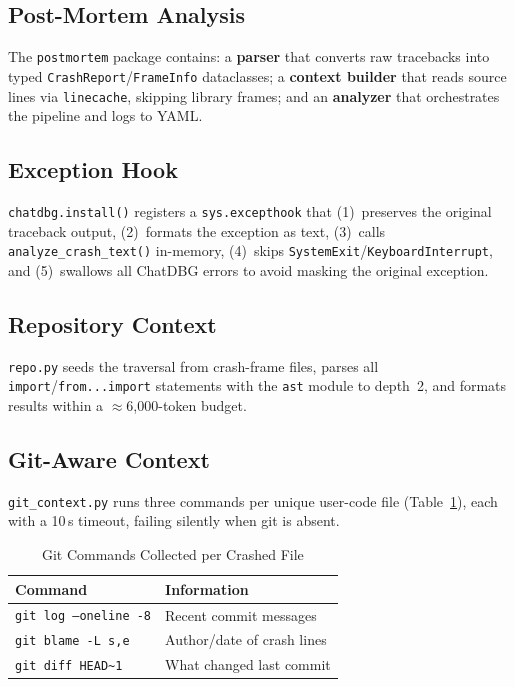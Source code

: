 \documentclass[conference]{IEEEtran}
\begin{document}
\subsection{Post-Mortem Analysis}
The \texttt{postmortem} package contains: a \textbf{parser} that converts raw
tracebacks into typed \texttt{CrashReport}/\texttt{FrameInfo} dataclasses; a
\textbf{context builder} that reads source lines via \texttt{linecache},
skipping library frames; and an \textbf{analyzer} that orchestrates the pipeline
and logs to YAML.

\subsection{Exception Hook}
\texttt{chatdbg.install()} registers a \texttt{sys.excepthook} that
(1)~preserves the original traceback output, (2)~formats the exception as text,
(3)~calls \texttt{analyze\_crash\_text()} in-memory,
(4)~skips \texttt{SystemExit}/\texttt{KeyboardInterrupt}, and
(5)~swallows all ChatDBG errors to avoid masking the original exception.

\subsection{Repository Context}
\texttt{repo.py} seeds the traversal from crash-frame files, parses all
\texttt{import}/\texttt{from...import} statements with the \texttt{ast} module
to depth~2, and formats results within a $\approx$6,000-token budget.

\subsection{Git-Aware Context}
\texttt{git\_context.py} runs three commands per unique user-code file
(Table~\ref{tab:git}), each with a 10\,s timeout, failing silently when git
is absent.

\begin{table}[t]
\centering
\caption{Git Commands Collected per Crashed File}
\label{tab:git}
\small
\begin{tabular}{ll}
\toprule
\textbf{Command} & \textbf{Information} \\
\midrule
\texttt{git log --oneline -8} & Recent commit messages \\
\texttt{git blame -L s,e}     & Author/date of crash lines \\
\texttt{git diff HEAD\textasciitilde1} & What changed last commit \\
\bottomrule
\end{tabular}
\end{table}
\end{document}

